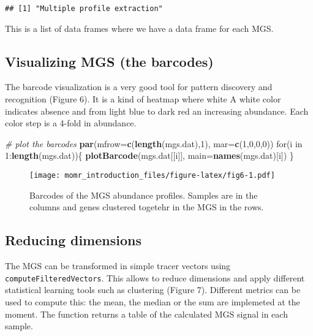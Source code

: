 \documentclass[]{article}
\newenvironment{Shaded}{\begin{snugshade}}{\end{snugshade}}
\newcommand{\KeywordTok}[1]{\textcolor[rgb]{0.13,0.29,0.53}{\textbf{{#1}}}}
\newcommand{\DataTypeTok}[1]{\textcolor[rgb]{0.13,0.29,0.53}{{#1}}}
\newcommand{\DecValTok}[1]{\textcolor[rgb]{0.00,0.00,0.81}{{#1}}}
\newcommand{\CommentTok}[1]{\textcolor[rgb]{0.56,0.35,0.01}{\textit{{#1}}}}
\newcommand{\NormalTok}[1]{{#1}}
\begin{document}
\begin{verbatim}
## [1] "Multiple profile extraction"
\end{verbatim}

This is a list of data frames where we have a data frame for each MGS.

\subsection{Visualizing MGS (the
barcodes)}\label{visualizing-mgs-the-barcodes}

The barcode visualization is a very good tool for pattern discovery and
recognition (Figure 6). It is a kind of heatmap where white A white
color indicates absence and from light blue to dark red an increasing
abundance. Each color step is a 4-fold in abundance.

\begin{Shaded}
\begin{Highlighting}[]
\CommentTok{# plot the barcodes}
\KeywordTok{par}\NormalTok{(}\DataTypeTok{mfrow=}\KeywordTok{c}\NormalTok{(}\KeywordTok{length}\NormalTok{(mgs.dat),}\DecValTok{1}\NormalTok{), }\DataTypeTok{mar=}\KeywordTok{c}\NormalTok{(}\DecValTok{1}\NormalTok{,}\DecValTok{0}\NormalTok{,}\DecValTok{0}\NormalTok{,}\DecValTok{0}\NormalTok{))}
\NormalTok{for(i in }\DecValTok{1}\NormalTok{:}\KeywordTok{length}\NormalTok{(mgs.dat))\{ }
  \KeywordTok{plotBarcode}\NormalTok{(mgs.dat[[i]], }\DataTypeTok{main=}\KeywordTok{names}\NormalTok{(mgs.dat)[i])}
\NormalTok{\}}
\end{Highlighting}
\end{Shaded}

\begin{figure}[htbp]
\centering
\texttt{[image: momr\_introduction\_files/figure-latex/fig6-1.pdf]}
\caption{Barcodes of the MGS abundance profiles. Samples are in the
columns and genes clustered togetehr in the MGS in the rows.}
\end{figure}

\subsection{Reducing dimensions}\label{reducing-dimensions}

The MGS can be transformed in simple tracer vectors using
\texttt{computeFilteredVectors}. This allows to reduce dimensions and
apply different statistical learning tools such as clustering (Figure
7). Different metrics can be used to compute this: the mean, the median
or the sum are implemeted at the moment. The function returns a table of
the calculated MGS signal in each sample.
\end{document}
